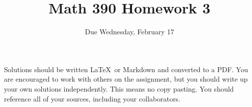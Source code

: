 \documentclass{article}
\title{Math 390 Homework 3}
\author{Due Wednesday, February 17}
\date{}
\begin{document}

\maketitle

\setlength{\parindent}{0em} %
\setlength{\parskip}{1em} %



Solutions should be written \LaTeX\ or Markdown and converted to a PDF. You are encouraged to work with others
on the assignment, but you should write up your own solutions independently. This means no copy pasting. You should
reference all of your sources, including your collaborators. 
\end{document}
